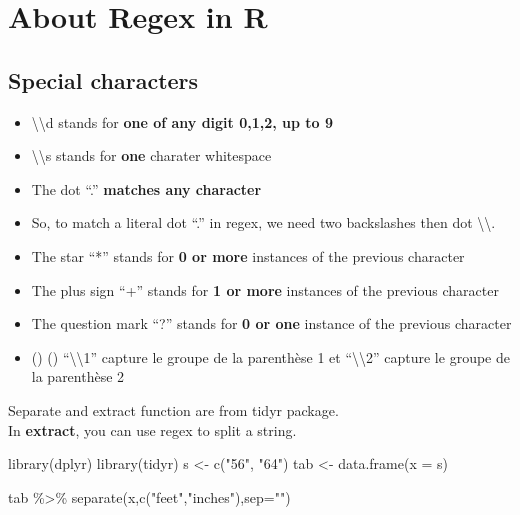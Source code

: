 \documentclass[
]{book}
\newenvironment{Shaded}{\begin{snugshade}}{\end{snugshade}}
\newcommand{\AttributeTok}[1]{\textcolor[rgb]{0.77,0.63,0.00}{#1}}
\newcommand{\FunctionTok}[1]{\textcolor[rgb]{0.00,0.00,0.00}{#1}}
\newcommand{\NormalTok}[1]{#1}
\newcommand{\OtherTok}[1]{\textcolor[rgb]{0.56,0.35,0.01}{#1}}
\newcommand{\SpecialCharTok}[1]{\textcolor[rgb]{0.00,0.00,0.00}{#1}}
\newcommand{\StringTok}[1]{\textcolor[rgb]{0.31,0.60,0.02}{#1}}
\providecommand{\tightlist}{%
  \setlength{\itemsep}{0pt}\setlength{\parskip}{0pt}}
\begin{document}
\hypertarget{about-regex-in-r}{%
\section{About Regex in R}\label{about-regex-in-r}}

\hypertarget{special-characters}{%
\subsection{Special characters}\label{special-characters}}

\begin{itemize}
\tightlist
\item
  \textbackslash\textbackslash d stands for \textbf{one of any digit 0,1,2, up to 9}
\item
  \textbackslash\textbackslash s stands for \textbf{one } charater whitespace
\item
  The dot ``.'' \textbf{matches any character}
\item
  So, to match a literal dot ``.'' in regex, we need two backslashes then dot \textbackslash\textbackslash.
\item
  The star ``*'' stands for \textbf{0 or more} instances of the previous character
\item
  The plus sign ``+'' stands for \textbf{1 or more} instances of the previous character
\item
  The question mark ``?'' stands for \textbf{0 or one} instance of the previous character
\item
  () () ``\textbackslash\textbackslash1'' capture le groupe de la parenthèse 1 et ``\textbackslash\textbackslash2'' capture le groupe de la parenthèse 2
\end{itemize}

Separate and extract function are from tidyr package.\\
In \textbf{extract}, you can use regex to split a string.

\begin{Shaded}
\begin{Highlighting}[]
\FunctionTok{library}\NormalTok{(dplyr)}
\FunctionTok{library}\NormalTok{(tidyr)}
\NormalTok{s }\OtherTok{\textless{}{-}} \FunctionTok{c}\NormalTok{(}\StringTok{"5\textquotesingle{}6"}\NormalTok{, }\StringTok{"6\textquotesingle{}4"}\NormalTok{)}
\NormalTok{tab }\OtherTok{\textless{}{-}} \FunctionTok{data.frame}\NormalTok{(}\AttributeTok{x =}\NormalTok{ s)}

\NormalTok{tab }\SpecialCharTok{\%\textgreater{}\%} \FunctionTok{separate}\NormalTok{(x,}\FunctionTok{c}\NormalTok{(}\StringTok{"feet"}\NormalTok{,}\StringTok{"inches"}\NormalTok{),}\AttributeTok{sep=}\StringTok{"\textquotesingle{}"}\NormalTok{)}
\end{Highlighting}
\end{Shaded}
\end{document}

